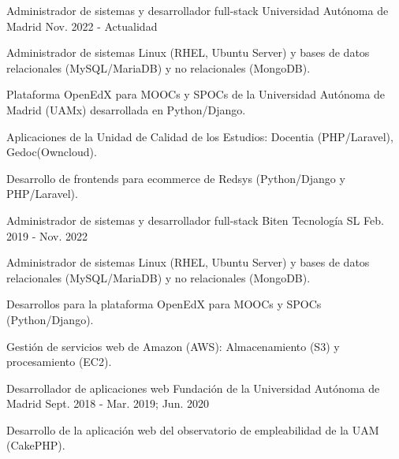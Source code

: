 

\begin{cventries}
  \cventry
    {Administrador de sistemas y desarrollador full-stack} %
    {Universidad Autónoma de Madrid} %
    {} %
    {Nov. 2022 - Actualidad} %
    {
      \begin{cvitems} %
        \item{Administrador de sistemas Linux (RHEL, Ubuntu Server) y bases de datos relacionales (MySQL/MariaDB) y no relacionales (MongoDB).}
		\item{Plataforma OpenEdX para MOOCs y SPOCs de la Universidad Autónoma de Madrid (UAMx) desarrollada en Python/Django.}
		\item{Aplicaciones de la Unidad de Calidad de los Estudios: Docentia (PHP/Laravel), Gedoc(Owncloud).}
		\item{Desarrollo de frontends para ecommerce de Redsys (Python/Django y PHP/Laravel).}
      \end{cvitems}
    }

  \cventry
    {Administrador de sistemas y desarrollador full-stack} %
    {Biten Tecnología SL} %
    {} %
    {Feb. 2019 - Nov. 2022} %
    {
    \begin{cvitems}
      \item{Administrador de sistemas Linux (RHEL, Ubuntu Server) y bases de datos relacionales (MySQL/MariaDB) y no relacionales (MongoDB).}
		\item{Desarrollos para la plataforma OpenEdX para MOOCs y SPOCs (Python/Django).}
		\item{Gestión de servicios web de Amazon (AWS): Almacenamiento (S3) y procesamiento (EC2).}
	\end{cvitems}
	}

  \cventry
    {Desarrollador de aplicaciones web} %
    {Fundación de la Universidad Autónoma de Madrid} %
    {} %
    {Sept. 2018 - Mar. 2019; Jun. 2020} %
    {
      \begin{cvitems} %
        \item {Desarrollo de la aplicación web del observatorio de empleabilidad de la UAM (CakePHP).}
      \end{cvitems}
    }


\end{cventries}
